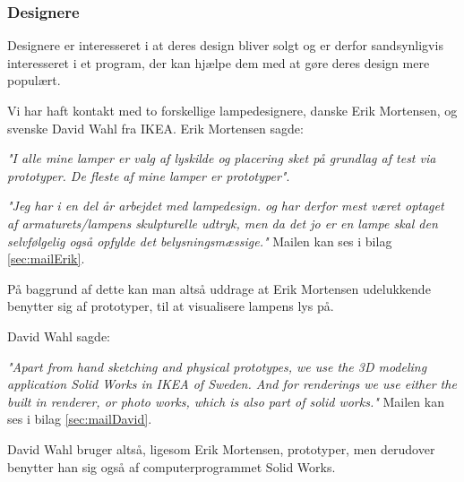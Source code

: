 \subsubsection{Designere}
Designere er interesseret i at deres design bliver solgt og er derfor sandsynligvis interesseret i et program, der kan hjælpe dem med at gøre deres design mere populært.

 
Vi har haft kontakt med to forskellige lampedesignere, danske Erik Mortensen, og svenske David Wahl fra IKEA. Erik Mortensen sagde: 
\begin{center}
\textit{"I alle mine lamper er valg af lyskilde og placering sket på grundlag af test via prototyper. De fleste af mine lamper er prototyper"}.

\textit{"Jeg har i en del år arbejdet med lampedesign. og har derfor mest været optaget af armaturets/lampens skulpturelle udtryk, men da det jo er en lampe skal den selvfølgelig  også opfylde det belysningsmæssige."} Mailen kan ses i bilag \ref{sec:mailErik}.
\end{center}

På baggrund af dette kan man altså uddrage at Erik Mortensen udelukkende benytter sig af prototyper, til at visualisere lampens lys på.

David Wahl sagde:
\begin{center}
\textit{"Apart from hand sketching and physical prototypes, we use the 3D modeling application Solid Works in IKEA of Sweden. And for renderings we use either the built in renderer, or photo works, which is also part of solid works."} Mailen kan ses i bilag \ref{sec:mailDavid}.
\end{center}

David Wahl bruger altså, ligesom Erik Mortensen, prototyper, men derudover benytter han sig også af computerprogrammet Solid Works.